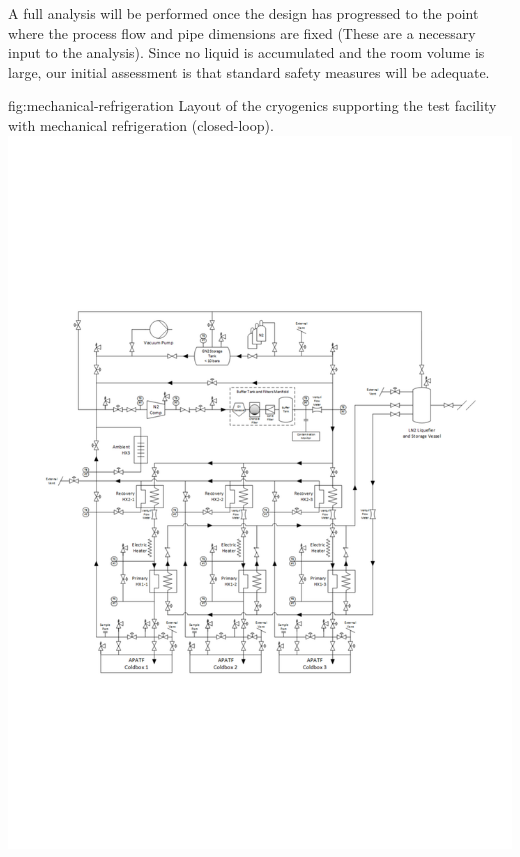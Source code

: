 A full  analysis will be performed once the design has progressed to the point where the process flow and pipe dimensions are fixed (These are a necessary input to the analysis).  %
Since no liquid is accumulated and the room volume is large, our initial assessment is that standard  safety measures will be adequate.

\begin{dunefigure}{fig:mechanical-refrigeration}
  {Layout of the cryogenics supporting the  test facility with mechanical refrigeration (closed-loop).}
\includegraphics[width=.98\textwidth]{graphics/Cryo-cold-box-mechanical.pdf}
\end{dunefigure}

